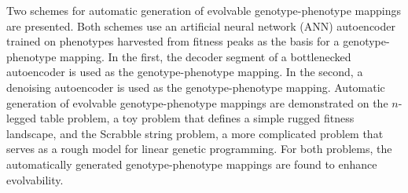 Two schemes for automatic generation of evolvable genotype-phenotype mappings are presented. Both schemes use an artificial neural network (ANN) autoencoder trained on phenotypes harvested from fitness peaks as the basis for a genotype-phenotype mapping. In the first, the decoder segment of a bottlenecked autoencoder is used as the genotype-phenotype mapping. In the second, a denoising autoencoder is used as the genotype-phenotype mapping. Automatic generation of evolvable genotype-phenotype mappings are demonstrated on the $n$-legged table problem, a toy problem that defines a simple rugged fitness landscape, and the Scrabble string problem, a more complicated problem that serves as a rough model for linear genetic programming. For both problems, the automatically generated genotype-phenotype mappings are found to enhance evolvability.
